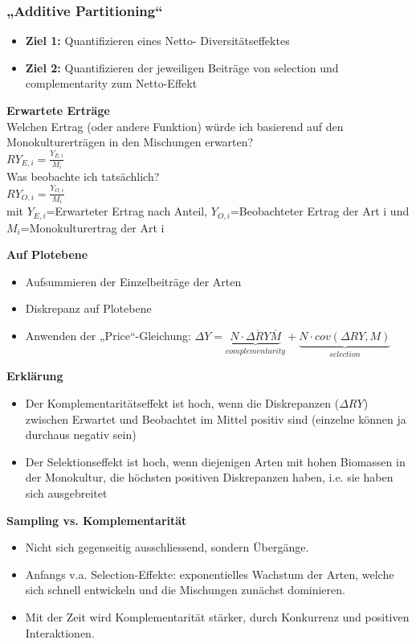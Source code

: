 \subsubsection{„Additive Partitioning“}
\begin{itemize}
	\item \textbf{Ziel 1:} Quantifizieren eines Netto- Diversitätseffektes
	\item \textbf{Ziel 2:} Quantifizieren der jeweiligen Beiträge von selection und complementarity zum Netto-Effekt
\end{itemize}

\textbf{Erwartete Erträge}\\
Welchen Ertrag (oder andere Funktion) würde ich basierend auf den Monokulturerträgen in den Mischungen erwarten?\\
$RY_{E,i}=\frac{Y_{E,i}}{M_i}$\\

Was beobachte ich tatsächlich?\\
$RY_{O,i}=\frac{Y_{O,i}}{M_i}$\\

mit $Y_{E,i}$=Erwarteter Ertrag nach Anteil, $Y_{O,i}$=Beobachteter Ertrag der Art i und $M_i$=Monokulturertrag der Art i

\textbf{Auf Plotebene}
\begin{itemize}
	\item Aufsummieren der Einzelbeiträge der Arten
	\item Diskrepanz auf Plotebene
	\item Anwenden der „Price“-Gleichung: $\Delta Y=\underbrace{N  \cdot  \overline{\Delta RY}\overline{M}}_{complementarity}+\underbrace{N \cdot cov(\Delta RY, M)}_{selection}$
\end{itemize}

\textbf{Erklärung}
\begin{itemize}
	\item Der Komplementaritätseffekt ist hoch, wenn die Diskrepanzen ($\Delta RY$) zwischen Erwartet und Beobachtet im Mittel positiv sind (einzelne können ja durchaus negativ sein)
	\item Der Selektionseffekt ist hoch, wenn diejenigen Arten mit hohen Biomassen in der Monokultur, die höchsten positiven Diskrepanzen haben, i.e. sie haben sich ausgebreitet
\end{itemize}

\textbf{Sampling vs. Komplementarität}
\begin{itemize}
	\item Nicht sich gegenseitig ausschliessend, sondern Übergänge.
	\item Anfangs v.a. Selection-Effekte: exponentielles Wachstum der Arten, welche sich schnell entwickeln und die Mischungen zunächst dominieren.
	\item Mit der Zeit wird Komplementarität stärker, durch Konkurrenz und positiven Interaktionen.
\end{itemize}

